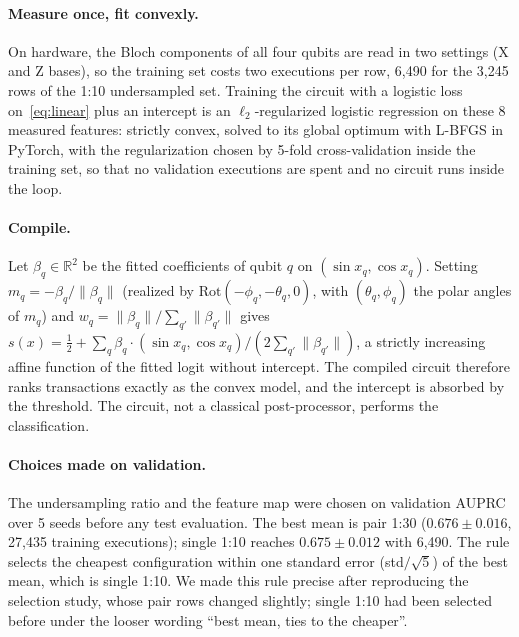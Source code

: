 \documentclass[10pt,twocolumn]{article}
\theoremstyle{definition}
\begin{document}
\paragraph{Measure once, fit convexly.} On hardware, the Bloch components of all four qubits are read in two
settings (X and Z bases), so the training set costs two executions per row, 6,490 for the 3,245 rows of the 1:10
undersampled set. Training the circuit with a logistic loss on~\eqref{eq:linear} plus an intercept is an
$\ell_2$-regularized logistic regression on these 8 measured features: strictly convex, solved to its global
optimum with L-BFGS in PyTorch, with the regularization chosen by 5-fold cross-validation inside the training
set, so that no validation executions are spent and no circuit runs inside the loop.

\paragraph{Compile.} Let $\beta_q\in\mathbb R^2$ be the fitted coefficients of qubit $q$ on
$(\sin x_q,\cos x_q)$. Setting $m_q=-\beta_q/\lVert\beta_q\rVert$ (realized by $\mathrm{Rot}(-\phi_q,-\theta_q,0)$,
with $(\theta_q,\phi_q)$ the polar angles of $m_q$) and $w_q=\lVert\beta_q\rVert/\sum_{q'}\lVert\beta_{q'}\rVert$
gives $s(x)=\tfrac12+\sum_q\beta_q\cdot(\sin x_q,\cos x_q)/(2\sum_{q'}\lVert\beta_{q'}\rVert)$, a strictly
increasing affine function of the fitted logit without intercept. The compiled circuit therefore ranks
transactions exactly as the convex model, and the intercept is absorbed by the threshold. The circuit, not a
classical post-processor, performs the classification.

\paragraph{Choices made on validation.} The undersampling ratio and the feature map were chosen on validation
AUPRC over 5 seeds before any test evaluation. The best mean is pair 1:30 ($0.676\pm0.016$, 27,435 training
executions); single 1:10 reaches $0.675\pm0.012$ with 6,490. The rule selects the cheapest configuration within one
standard error (std$/\sqrt5$) of the best mean, which is single 1:10. We made this rule precise after reproducing
the selection study, whose pair rows changed slightly; single 1:10 had been selected before under the looser wording
``best mean, ties to the cheaper''.
\end{document}
